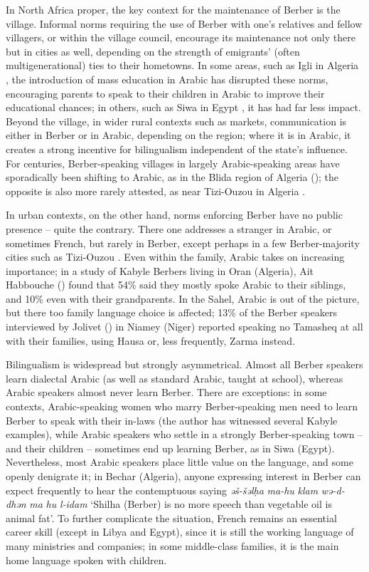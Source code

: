 \documentclass[output=paper]{langsci/langscibook}
\begin{document}
In North Africa proper, the key context for the maintenance of Berber is the village. Informal norms requiring the use of Berber with one's relatives and fellow villagers, or within the village council, encourage its maintenance not only there but in cities as well, depending on the strength of emigrants' (often multigenerational) ties to their hometowns. In some areas, such as Igli in Algeria \citep{Mouili2013}, the introduction of mass education in Arabic has disrupted these norms, encouraging parents to speak to their children in Arabic to improve their educational chances; in others, such as Siwa in Egypt \citep{Serreli2017}, it has had far less impact. Beyond the village, in wider rural contexts such as markets, communication is either in Berber or in Arabic, depending on the region; where it is in Arabic, it creates a strong incentive for bilingualism independent of the state's influence.  For centuries, Berber-speaking villages in largely Arabic-speaking areas have sporadically been shifting to Arabic, as in the Blida region of Algeria (\citealt{ElArifi2014}); the opposite is also more rarely attested, as near Tizi-Ouzou in Algeria \citep[258]{Gautier1913}.

In urban contexts, on the other hand, norms enforcing Berber have no public presence – quite the contrary.  There one addresses a stranger in Arabic, or sometimes French, but rarely in Berber, except perhaps in a few Berber-majority cities such as Tizi{}-Ouzou \citep{Tigziri2008}.  Even within the family, Arabic takes on increasing importance; in a study of Kabyle Berbers living in Oran (Algeria), Ait Habbouche (\citeyear[79]{AitHabbouche2013}) found that 54\% said they mostly spoke Arabic to their siblings, and 10\% even with their grandparents. In the Sahel, Arabic is out of the picture, but there too family language choice is affected; 13\% of the Berber speakers interviewed by Jolivet (\citeyear[146]{Jolivet2008}) in Niamey (Niger) reported speaking no Tamasheq at all with their families, using Hausa or, less frequently, Zarma instead.

Bilingualism is widespread but strongly asymmetrical. Almost all Berber speakers learn dialectal Arabic (as well as standard Arabic, taught at school), whereas Arabic speakers almost never learn Berber.  There are exceptions: in some contexts, Arabic-speaking women who marry Berber-speaking men need to learn Berber to speak with their in-laws (the author has witnessed several Kabyle examples), while Arabic speakers who settle in a strongly Berber-speaking town – and their children – sometimes end up learning Berber, as in Siwa (Egypt). Nevertheless, most Arabic speakers place little value on the language, and some openly denigrate it; in Bechar (Algeria), anyone expressing interest in Berber can expect frequently to hear the contemptuous saying \textit{əš-šəlḥa} \textit{ma-hu} \textit{klam} \textit{wə-d-dhən} \textit{ma} \textit{hu} \textit{l-idam} `Shilha (Berber) is no more speech than vegetable oil is animal fat'. To further complicate the situation, French remains an essential career skill (except in Libya and Egypt), since it is still the working language of many ministries and companies; in some middle-class families, it is the main home language spoken with children.
\end{document}
